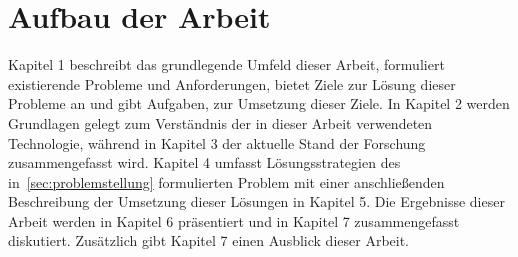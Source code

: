 \section{Aufbau der Arbeit}
Kapitel 1 beschreibt das grundlegende Umfeld dieser Arbeit, formuliert existierende Probleme und Anforderungen, bietet Ziele zur Lösung dieser Probleme an und gibt Aufgaben, zur Umsetzung dieser Ziele.
In Kapitel 2 werden Grundlagen gelegt zum Verständnis der in dieser Arbeit verwendeten Technologie, während in Kapitel 3 der aktuelle Stand der Forschung zusammengefasst wird.
Kapitel 4 umfasst Lösungsstrategien des in~\cref{sec:problemstellung} formulierten Problem mit einer anschließenden Beschreibung der Umsetzung dieser Lösungen in Kapitel 5.
Die Ergebnisse dieser Arbeit werden in Kapitel 6 präsentiert und in Kapitel 7 zusammengefasst diskutiert.
Zusätzlich gibt Kapitel 7 einen Ausblick dieser Arbeit.
